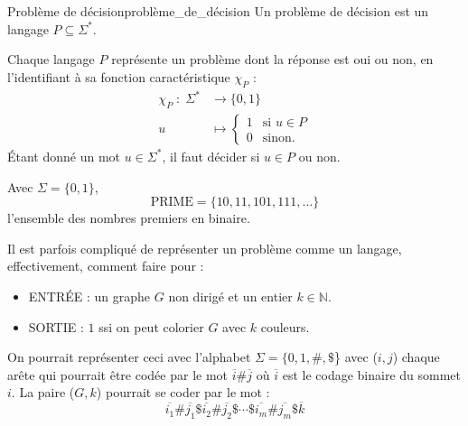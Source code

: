 \begin{definition}{Problème de décision}{problème_de_décision}
  Un problème de décision est un langage $P\subseteq\Sigma^*$.
\end{definition}
\begin{remark}
    Chaque langage $P$ représente un problème dont la réponse est oui ou non, en l'identifiant à sa fonction caractéristique
    $\chi_P$ :
    \begin{equation*}
        \begin{aligned}
            \chi_P\; :\; \Sigma^* &\rightarrow \{0,1\} \\
            u &\mapsto \begin{cases}
                1 & \text{si } u \in P \\
                0 & \text{sinon.}
            \end{cases}
        \end{aligned}
    \end{equation*}
    Étant donné un mot $u\in \Sigma^*$, il faut décider si $u\in P$ ou non.
\end{remark}
\begin{example}
    Avec $\Sigma = \{0,1\}$,
    \begin{equation*}
        \text{PRIME} = \{10,11,101,111,\dots\} 
    \end{equation*}
    l'ensemble des nombres premiers en binaire.
\end{example}
Il est parfois compliqué de représenter un problème comme un langage, effectivement, comment faire pour :
\begin{itemize}[label=\textbullet]
    \item ENTRÉE : un graphe $G$ non dirigé et un entier $k\in\mathbb{N}$.
    \item SORTIE : $1$ ssi on peut colorier $G$ avec $k$ couleurs.
\end{itemize}
On pourrait représenter ceci avec l'alphabet $\Sigma = \{0,1,\#,\$$\} avec ($i,j$) chaque arête qui pourrait être codée par 
le mot $\overline{i}\#\overline{j}$ où $\overline{i}$ est le codage binaire du sommet $i$. La paire ($G,k$) pourrait se 
coder par le mot :
\begin{equation*}
    \overline{i_1}\#\overline{j_1}\$\overline{i_2}\#\overline{j_2}\$\cdots\$\overline{i_m}\#\overline{j_m}\$\overline{k}
\end{equation*}

